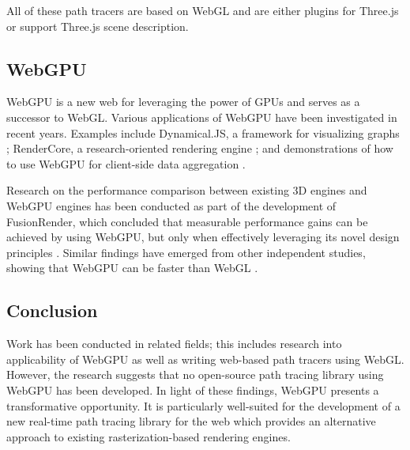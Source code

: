All of these path tracers are based on \gls{WebGL} and are either plugins for \gls{Three.js} or support \gls{Three.js} scene description.

\subsection*{WebGPU}

\gls{WebGPU} is a new web  for leveraging the power of \glspl{GPU} and serves as a successor to \gls{WebGL}. Various applications of \gls{WebGPU} have been investigated in recent years. Examples include Dynamical.JS, a framework for visualizing graphs \cite{dotson2022dynamicaljs}; RenderCore, a research-oriented rendering engine \cite{Bohak_Kovalskyi_Linev_Mrak_Tadel_Strban_Tadel_Yagil_2024}; and demonstrations of how to use \gls{WebGPU} for client-side data aggregation \cite{kimmersdorfer2023webgpu}.

Research on the performance comparison between existing 3D engines and \gls{WebGPU} engines has been conducted as part of the development of FusionRender, which concluded that measurable performance gains can be achieved by using \gls{WebGPU}, but only when effectively leveraging its novel design principles \cite{fusionRenderWebGPU}. Similar findings have emerged from other independent studies, showing that \gls{WebGPU} can be faster than \gls{WebGL} \cite{webGPUWebGis, fransson2023performance, CHICKERUR2024919}.

\subsection*{Conclusion}

Work has been conducted in related fields; this includes research into applicability of \gls{WebGPU} as well as writing web-based path tracers using \gls{WebGL}. However, the research suggests that no open-source path tracing library using \gls{WebGPU} has been developed. In light of these findings, \gls{WebGPU} presents a transformative opportunity. It is particularly well-suited for the development of a new real-time path tracing library for the web which provides an alternative approach to existing rasterization-based rendering engines.
